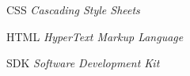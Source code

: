 
\begin{SingleSpace}

	\begin{siglas}
		\item[CSS] \textit{Cascading Style Sheets}
		\item[HTML] \textit{HyperText Markup Language}
		\item[SDK]  \textit{Software Development Kit}
	\end{siglas}

\end{SingleSpace}
